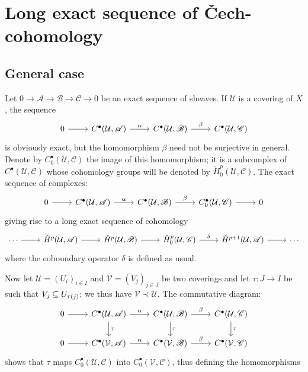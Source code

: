 \section{Long exact sequence of \v{C}ech-cohomology}
\subsection{General case}
Let $0\to\mathscr{A}\to\mathscr{B}\to\mathscr{C}\to 0$ be an exact sequence of sheaves. If $\mathcal{U}$ is a covering of $X$, the sequence
\[\begin{tikzcd}
0\ar[r]&C^\bullet(\mathcal{U},\mathscr{A})\ar[r,"\alpha"]&C^\bullet(\mathcal{U},\mathscr{B})\ar[r,"\beta"]&C^\bullet(\mathcal{U},\mathscr{C})
\end{tikzcd}\]
is obviously exact, but the homomorphism $\beta$ need not be surjective in general. Denote by $C_0^\bullet(\mathcal{U},\mathscr{C})$ the image of this homomorphism; it is a subcomplex of $C^\bullet(\mathcal{U},\mathscr{C})$ whose cohomology groups will be denoted by $\check{H}^p_0(\mathcal{U},\mathscr{C})$. The exact sequence of complexes:
\[\begin{tikzcd}
0\ar[r]&C^\bullet(\mathcal{U},\mathscr{A})\ar[r,"\alpha"]&C^\bullet(\mathcal{U},\mathscr{B})\ar[r,"\beta"]&C_0^\bullet(\mathcal{U},\mathscr{C})\ar[r]&0
\end{tikzcd}\]
giving rise to a long exact sequence of cohomology
\[\begin{tikzcd}
\cdots\ar[r]&\check{H}^p(\mathcal{U},\mathscr{A})\ar[r]&\check{H}^p(\mathcal{U},\mathscr{B})\ar[r]&\check{H}^p_0(\mathcal{U},\mathscr{C})\ar[r,"\delta"]&\check{H}^{p+1}(\mathcal{U},\mathscr{A})\ar[r]&\cdots
\end{tikzcd}\]
where the coboundary operator $\delta$ is defined as usual.\par 
Now let $\mathcal{U}=(U_i)_{i\in I}$ and $\mathcal{V}=(V_j)_{j\in J}$ be two coverings and let $\tau:J\to I$ be such that $V_j\subseteq U_{\tau(j)}$; we thus have $\mathcal{V}\prec\mathcal{U}$. The commutative diagram:
\[\begin{tikzcd}
0\ar[r]&C^\bullet(\mathcal{U},\mathscr{A})\ar[r,"\alpha"]\ar[d,"\tau"]&C^\bullet(\mathcal{U},\mathscr{B})\ar[r,"\beta"]\ar[d,"\tau"]&C^\bullet(\mathcal{U},\mathscr{C})\ar[d,"\tau"]\\
0\ar[r]&C^\bullet(\mathcal{V},\mathscr{A})\ar[r,"\alpha"]&C^\bullet(\mathcal{V},\mathscr{B})\ar[r,"\beta"]&C^\bullet(\mathcal{V},\mathscr{C})
\end{tikzcd}\]
shows that $\tau$ maps $C_0^\bullet(\mathcal{U},\mathscr{C})$ into $C_0^\bullet(\mathcal{V},\mathscr{C})$, thus defining the homomorphisms
